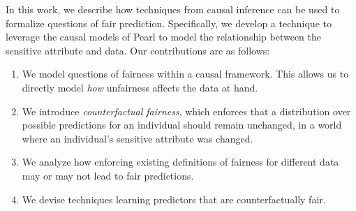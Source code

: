 In this work, we describe how techniques from causal inference can be used to formalize questions of fair prediction. Specifically, we develop a technique to leverage the causal models of Pearl \cite{pearl2009causal} to model the relationship between the sensitive attribute and data. Our contributions are as follows:
\begin{enumerate}
    \item We model questions of fairness within a causal framework. This allows us to directly model \emph{how} unfairness affects the data at hand.
    \item We introduce \emph{counterfactual fairness}, which enforces that a distribution over possible predictions for an individual should remain unchanged, in a world where an individual's sensitive attribute was changed.
    \item We analyze how enforcing existing definitions of fairness for different data may or may not lead to fair predictions.
    \item We devise techniques learning predictors that are counterfactually fair.
\end{enumerate}











